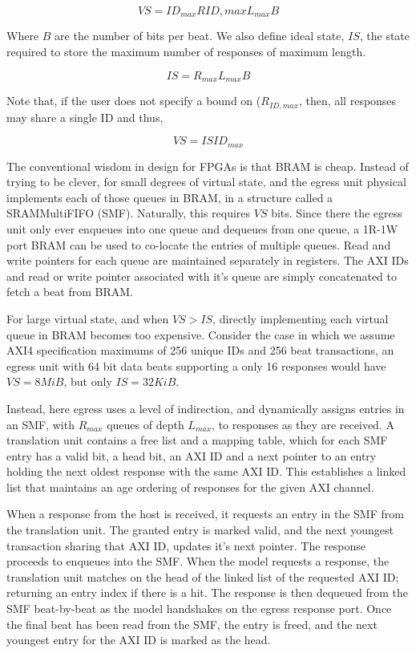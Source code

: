 $$VS = ID_{max}R{ID,max}L_{max}B$$

Where $B$ are the number of bits per beat. We also define ideal state, $IS$,
the state required to store the maximum number of responses of maximum length.

$$IS = R_{max}L_{max}B$$

Note that, if the user does not specify a bound on ($R_{ID,max}$, then, all
responses may share a single ID and thus,

$$VS = ISID_{max}$$

The conventional wisdom in design for FPGAs is that BRAM is cheap. Instead of
trying to be clever, for small degrees of virtual state, and the egress unit
physical implements each of those queues in BRAM, in a structure called a
SRAMMultiFIFO (SMF)\cite{smf}. Naturally, this requires $VS$ bits. Since there the egress unit only ever enqueues
into one queue and dequeues from one queue, a 1R-1W port BRAM can be used to
co-locate the entries of multiple queues.  Read and write pointers for each
queue are maintained separately in registers. The AXI IDs and read or write
pointer associated with it's queue are simply concatenated to fetch a beat from
BRAM.

For large virtual state, and when $VS > IS$, directly implementing each virtual
queue in BRAM becomes too expensive. Consider the case in which we assume AXI4
specification maximums of 256 unique IDs and 256 beat transactions, an egress
unit with 64 bit data beats supporting a only 16 responses would have $VS =
8MiB$, but only $IS = 32 KiB$.

Instead, here egress uses a level of indirection, and dynamically assigns
entries in an SMF, with $R_{max}$ queues of depth $L_{max}$, to responses as
they are received. A translation unit contains a free list and a mapping table,
which for each SMF entry has a valid bit, a head bit, an AXI ID and a next
pointer to an entry holding the next oldest response with the same AXI ID. This
establishes a linked list that maintains an age ordering of responses for the
given AXI channel.

When a response from the host is received, it requests an entry in the SMF from
the translation unit. The granted entry is marked valid, and the next youngest
transaction sharing that AXI ID, updates it's next pointer.  The response
proceeds to enqueues into the SMF. When the model requests a response, the
translation unit matches on the head of the linked list of the requested AXI
ID; returning an entry index if there is a hit. The response is then dequeued
from the SMF beat-by-beat as the model handshakes on the egress response port.
Once the final beat has been read from the SMF, the entry is freed, and the
next youngest entry for the AXI ID is marked as the head.

